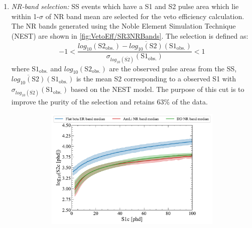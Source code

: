 \begin{enumerate}
	\item \textit{NR-band selection:} SS events which have a S1 and S2 pulse area which lie within 1-$\sigma$ of NR band mean are selected for the veto efficiency calculation.
    The NR bands generated using the Noble Element Simulation Technique (NEST) \cite{NEST2011} are shown in \autoref{fig:VetoEff/SR3NRBands}. 
    The selection is defined as:
    \begin{equation}\label{eqn:VetoEff/NRBandSelection}
        -1<\frac{log_{10}(\text{S2}_\text{obs.})-\overline{log_{10}(\text{S2})}(\text{S1}_\text{obs.})}{\sigma_{log_{10}(\overline{\text{S2}})}(\text{S1}_\text{obs.})}<1
    \end{equation}
    where $\text{S1}_\text{obs.}$ and $log_{10}(\text{S2}_\text{obs.})$ are the observed pulse areas from the SS, $\overline{log_{10}(\text{S2})}(\text{S1}_\text{obs.})$ is the mean S2 corresponding to a observed S1 with $\sigma_{log_{10}(\overline{\text{S2}})}(\text{S1}_\text{obs.})$ based on the NEST model. The purpose of this cut is to improve the purity of the selection and retains 63\% of the data.
    \begin{figure}[!ht]
    \centering
    \begin{subfigure}[b]{0.49\textwidth}
        \centering
        \includegraphics[width=\textwidth]{figures/VetoEfficiency/NRBands.pdf}
        \caption{}
        \label{fig:VetoEff/SR3NRBands}
    \end{subfigure}
    \hfill
    \begin{subfigure}[b]{0.49\textwidth}
        \centering

\end{subfigure}
\end{figure}
\end{enumerate}
